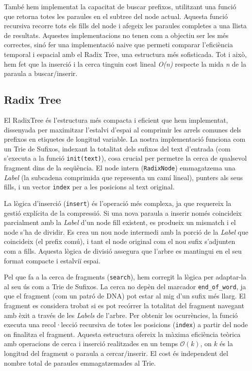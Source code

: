 També hem implementat la capacitat de buscar prefixos, utilitzant una funció que retorna totes les paraules en el subtree del node actual. Aquesta funció recursiva recorre tots els fills del node i afegeix les paraules completes a una llista de resultats.
Aquestes implementacions no tenen com a objectiu ser les més correctes, sinó fer una implementació naive que permeti comparar l'eficiència temporal i espacial amb el Radix Tree, una estructura més sofisticada. Tot i això, hem fet que la inserció i la cerca tinguin cost lineal \textit{O(n)} respecte la mida \textit{n} de la paraula a buscar/inserir.

\subsection{Radix Tree}
El RadixTree és l'estructura més compacta i eficient que hem implementat, dissenyada per maximitzar l'estalvi d'espai al comprimir les arrels comunes dels prefixos en etiquetes de longitud variable. La nostra implementació funciona com un Trie de Sufixos, indexant la totalitat dels sufixos del text d'entrada (com s'executa a la funció \texttt{init(text)}), cosa crucial per permetre la cerca de qualsevol fragment dins de la seqüència. El node intern (\texttt{RadixNode}) emmagatzema una \textit{Label} (la subcadena comprimida que representa un camí lineal), punters als seus fills, i un vector \texttt{index} per a les posicions al text original.

La lògica d'inserció (\texttt{insert}) és l'operació més complexa, ja que requereix la gestió explícita de la compressió. Si una nova paraula a inserir només coincideix parcialment amb la \textit{Label} d'un node fill existent, es produeix un mismatch i el node s'ha de dividir. Es crea un nou node intermedi amb la porció de la \textit{Label} que coincideix (el prefix comú), i tant el node original com el nou sufix s'adjunten com a fills. Aquesta lògica de divisió assegura que l'arbre es mantingui en el seu format compacte i estalviï espai.

Pel que fa a la cerca de fragments (\texttt{search}), hem corregit la lògica per adaptar-la al seu ús com a Trie de Sufixos. La cerca no depèn del marcador \texttt{end\_of\_word}, ja que el fragment (com un patró de DNA) pot estar al mig d'un sufix més llarg. El fragment es considera trobat si es pot recórrer la totalitat del fragment navegant amb èxit a través de les \textit{Labels} de l'arbre. Per obtenir les ocurrències, la funció executa una recol·lecció recursiva de totes les posicions (\texttt{index}) a partir del node on finalitza el fragment. Aquesta estructura ofereix la màxima eficiència teòrica amb operacions de cerca i inserció realitzades en un temps $\mathcal{O}(k)$, on $k$ és la longitud del fragment o paraula a cercar/inserir. El cost és independent del nombre total de paraules emmagatzemades al Trie.

